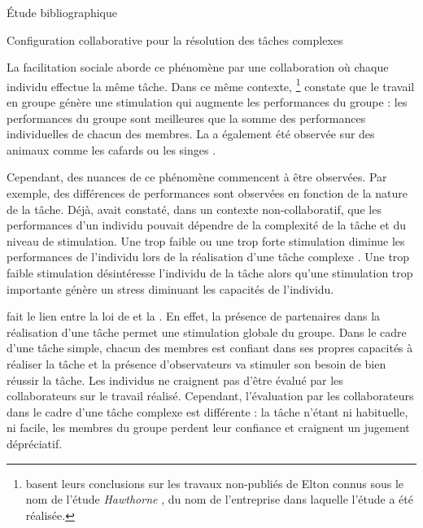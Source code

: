 \documentclass[myfrancais,ngerman,english,french]{mythesis}
\begin{document}
\begin{mychapter}{Étude bibliographique}
\begin{mysection}{Configuration collaborative pour la résolution des tâches complexes}
\begin{mysubsection}{La facilitation sociale}
				 aborde ce phénomène par une collaboration où chaque individu effectue la même tâche.
				Dans ce même contexte, \footnote{ basent leurs conclusions sur les travaux non-publiés de Elton  connus sous le nom de \og l'étude \textit{Hawthorne} \fg, du nom de l'entreprise \myHawthorne dans laquelle l'étude a été réalisée.} constate que le travail en groupe génère une stimulation qui augmente les performances du groupe : les performances du groupe sont meilleures que la somme des performances individuelles de chacun des membres.
				La  a également été observée sur des animaux comme les cafards  ou les singes .

				Cependant, des nuances de ce phénomène commencent à être observées.
				Par exemple, des différences de performances sont observées en fonction de la nature de la tâche.
				Déjà,  avait constaté, dans un contexte non-collaboratif, que les performances d'un individu pouvait dépendre de la complexité de la tâche et du niveau de stimulation.
				Une trop faible ou une trop forte stimulation diminue les performances de l'individu lors de la réalisation d'une tâche complexe .
				Une trop faible stimulation désintéresse l'individu de la tâche alors qu'une stimulation trop importante génère un stress diminuant les capacités de l'individu.

				 fait le lien entre la loi de  et la .
				En effet, la présence de partenaires dans la réalisation d'une tâche permet une stimulation globale du groupe.
				Dans le cadre d'une tâche simple, chacun des membres est confiant dans ses propres capacités à réaliser la tâche et la présence d'observateurs va stimuler son besoin de bien réussir la tâche.
				Les individus ne craignent pas d'être évalué par les collaborateurs sur le travail réalisé.
				Cependant, l'évaluation par les collaborateurs dans le cadre d'une tâche complexe est différente : la tâche n'étant ni habituelle, ni facile, les membres du groupe perdent leur confiance et craignent un jugement dépréciatif.


\end{mysubsection}
\end{mysection}
\end{mychapter}
\end{document}
